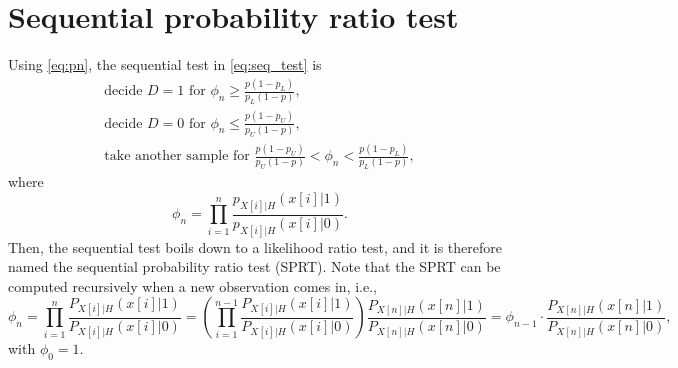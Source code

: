 \section{Sequential probability ratio test}

Using \eqref{eq:pn}, the sequential test in \eqref{eq:seq_test} is
\begin{equation}
	\label{eq:seq_SPRT_mincost}
	\begin{array}{l}
		\text{decide } D = 1 \text{ for } \phi_n \geq \frac{p (1 - p_L)}{p_L(1 - p)}, \\
		\text{decide } D = 0 \text{ for } \phi_n \leq  \frac{p (1 - p_U)}{p_U (1 - p)}, \\
		\text{take another sample for } \frac{p (1 - p_U)}{p_U (1 - p)} < \phi_n < \frac{p (1 - p_L)}{p_L(1 - p)},
	\end{array}
\end{equation}
where
\begin{equation*}
	\phi_n = \prod_{i = 1}^{n} \frac{p_{X[i] | H}(x[i] | 1)}{p_{X[i] | H}(x[i] | 0)}.
\end{equation*}
Then, the sequential test boils down to a likelihood ratio test, and it is therefore named the sequential probability ratio test (SPRT). Note that the SPRT can be computed recursively when a new observation comes in, i.e.,
\begin{equation*}
	\phi_n = \prod_{i = 1}^{n} \frac{P_{X[i] | H}(x[i] | 1)}{P_{X[i] | H}(x[i] | 0)} = \left(\prod_{i = 1}^{n-1} \frac{P_{X[i] | H}(x[i] | 1)}{P_{X[i] | H}(x[i] | 0)}\right) \frac{P_{X[n] | H}(x[n] | 1)}{P_{X[n] | H}(x[n] | 0)} = \phi_{n-1} \cdot \frac{P_{X[n] | H}(x[n] | 1)}{P_{X[n] | H}(x[n] | 0)},
\end{equation*}
with $\phi_0 = 1$.

